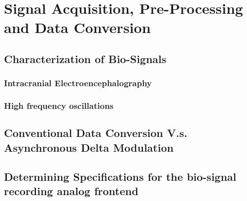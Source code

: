 \chapter{Signal Acquisition, Pre-Processing and Data Conversion}
\label{chapter:sig-acq}
\section{Characterization of Bio-Signals}
\subsection{Intracranial Electroencephalography}
\subsection{High frequency oscillations}%
\section{Conventional Data Conversion V.s. Asynchronous Delta Modulation}
\section{Determining Specifications for the bio-signal recording analog frontend}

